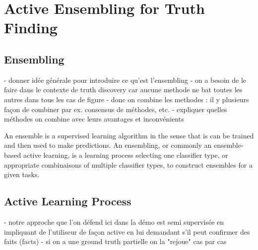 \section{Active Ensembling for Truth Finding}

\subsection{Ensembling }
- donner idée générale pour introduire  ce qu'est l'ensembling
- on a besoin de le faire dans le contexte de truth discovery car aucune methode ne bat toutes les autres dans tous les cas de figure
- donc on combine les methodes : il y plusieurs façon de combiner par ex. consensus de méthodes, etc.
- expliquer quelles méthodes on combine avec leurs avantages et inconvénients

An ensemble is a supervised learning algorithm in the sense that is can be trained and then used to make predictions.
An ensembling, or  commonly an ensemble-based active learning, is a learning process selecting one classifier type, or appropriate combinaisons 
of multiple classifier types, to construct ensembles for a given tasks.

\subsection{Active Learning Process}
- notre approche que l'on défend ici dans la démo est  semi supervisée en impliquant de l'utiliseur de façon active
en lui demandant s'il peut confirmer des faits (facts)
- si on a une ground truth partielle on la "rejoue" cas par cas

